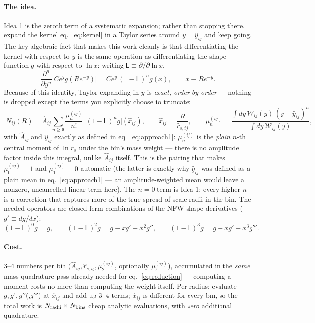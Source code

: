 \documentclass[a4paper, 11pt]{article}
\newcommand{\rs}{r_s}
\newcommand{\reffi}[1]{\hat r_{s,#1}}
\newcommand{\yeff}{\hat y}
\newcommand{\Aeff}{\hat A}
\newcommand{\Wcal}{\mathcal{W}}
\newcommand{\Lop}{\mathsf{L}}
\begin{document}
\paragraph{The idea.} Idea 1 is the zeroth term of a systematic
expansion; rather than stopping there, expand the kernel
eq.~\eqref{eq:kernel} in a Taylor series around $y=\yeff_{ij}$ and
keep going. The key algebraic fact that makes this work cleanly is
that differentiating the kernel with respect to $y$ is the same
operation as differentiating the shape function $g$ with respect
to $\ln x$: writing $\Lop\equiv\partial/\partial\ln x$,
\begin{equation}
\frac{\partial^n}{\partial y^n}\Big[C e^y g(Re^{-y})\Big]
= C e^y\,(1-\Lop)^n g(x),
\qquad x \equiv R e^{-y}.
\label{eq:deriv_identity}
\end{equation}
Because of this identity, Taylor-expanding in $y$ is \emph{exact,
order by order} --- nothing is dropped except the terms you
explicitly choose to truncate:
\begin{equation}
\boxed{\;
N_{ij}(R) = \Aeff_{ij} \sum_{n\ge0} \frac{\mu_n^{(ij)}}{n!}\,
\big[(1-\Lop)^n g\big](\hat x_{ij}),
\qquad
\hat x_{ij} = \frac{R}{\reffi{ij}},
\qquad
\mu_n^{(ij)} = \frac{\int dy\,\Wcal_{ij}(y)\,(y-\yeff_{ij})^n}
{\int dy\,\Wcal_{ij}(y)},
\;}
\label{eq:approach2}
\end{equation}
with $\Aeff_{ij}$ and $\yeff_{ij}$ exactly as defined in
eq.~\eqref{eq:approach1}: $\mu_n^{(ij)}$ is the \emph{plain}
$n$-th central moment of $\ln\rs$ under the bin's mass weight ---
there is no amplitude factor inside this integral, unlike
$\Aeff_{ij}$ itself. This is the pairing that makes
$\mu_0^{(ij)}=1$ and $\mu_1^{(ij)}=0$ automatic (the latter is
exactly why $\yeff_{ij}$ was defined as a plain mean in
eq.~\ref{eq:approach1} --- an amplitude-weighted mean would leave a
nonzero, uncancelled linear term here). The $n=0$ term is Idea 1; every higher $n$
is a correction that captures more of the true spread of scale
radii in the bin. The needed operators are closed-form
combinations of the NFW shape derivatives ($g'\equiv dg/dx$):
\begin{equation}
(1-\Lop)^0 g = g,
\qquad
(1-\Lop)^2 g = g - x g' + x^2 g'',
\qquad
(1-\Lop)^3 g = g - x g' - x^3 g'''.
\label{eq:operators}
\end{equation}

\paragraph{Cost.} $3$--$4$ numbers per bin
($\Aeff_{ij},\reffi{ij},\mu_2^{(ij)}$, optionally $\mu_3^{(ij)}$),
accumulated in the \emph{same} mass-quadrature pass already needed
for eq.~\eqref{eq:reduction} --- computing a moment costs no more
than computing the weight itself. Per radius: evaluate
$g,g',g''$(,$g'''$) at $\hat x_{ij}$ and add up 3--4 terms;
$\hat x_{ij}$ is different for every bin, so the total work is
$N_{\rm radii}\times N_{\rm bins}$ cheap analytic evaluations, with
\emph{zero} additional quadrature.
\end{document}
